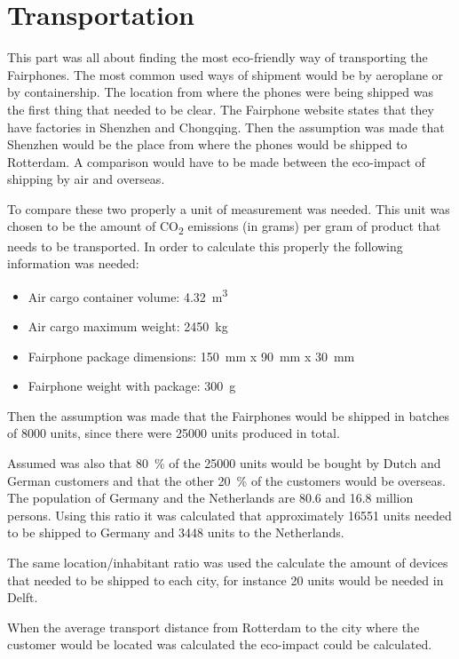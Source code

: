 \documentclass[final]{scrreprt} %
\begin{document}
\chapter{Transportation} %
\label{ch:transportation}

This part was all about finding the most eco-friendly way of transporting the Fairphones.
The most common used ways of shipment would be by aeroplane or by containership.
The location from where the phones were being shipped was the first thing that needed to be clear. 
The Fairphone website states that they have factories in Shenzhen and Chongqing. 
Then the assumption was made that Shenzhen would be the place from where the phones would be shipped to Rotterdam. 
A comparison would have to be made between the eco-impact of shipping by air and overseas.  

To compare these two properly a unit of measurement was needed.
This unit was chosen to be the amount of CO\textsubscript{2} emissions (in grams) per gram of product that needs to be transported.
In order to calculate this properly the following information was needed:

\begin{itemize}
\item Air cargo container volume: \SI{4.32}{\cubic\meter}
\item Air cargo maximum weight: \SI{2450}{\kilo\gram}
\item Fairphone package dimensions: \SI{150}{\milli\meter} x \SI{90}{\milli\meter} x \SI{30}{\milli\meter}
\item Fairphone weight with package: \SI{300}{\gram}
\end{itemize}
Then the assumption was made that the Fairphones would be shipped in batches of \num{8000} units, since there were \num{25000} units produced in total.

Assumed was also that \SI{80}{\percent} of the \num{25000} units would be bought by Dutch and German customers and that the other \SI{20}{\percent} of the customers would be overseas.
The population of Germany and the Netherlands are \num{80.6} and \num{16.8} million persons.
Using this ratio it was calculated that approximately \num{16551} units needed to be shipped to Germany and \num{3448} units to the Netherlands. 

The same location/inhabitant ratio was used the calculate the amount of devices that needed to be shipped to each city, for instance \num{20} units would be needed in Delft.

When the average transport distance from Rotterdam to the city where the customer would be located was calculated the eco-impact could be calculated.
 
\end{document}
